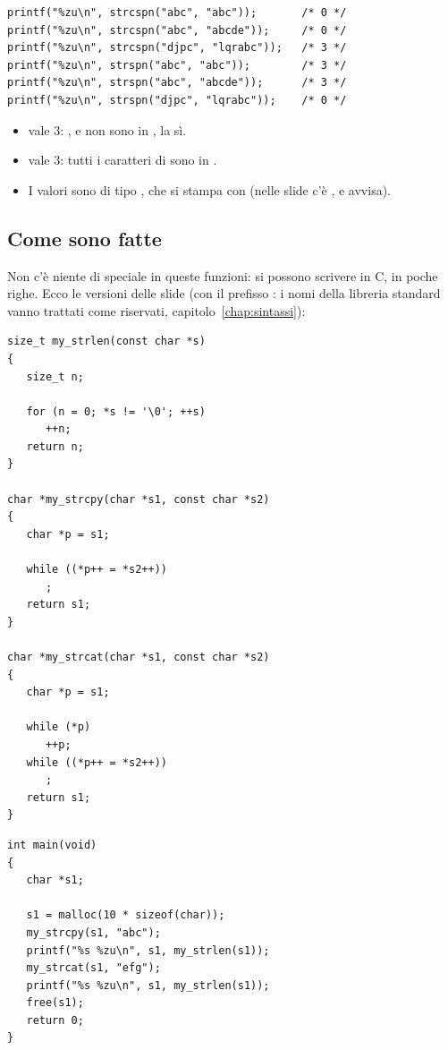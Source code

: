 \begin{affianco}[0.55][c]
\begin{lstlisting}[style=c, name=spn.c]
printf("%zu\n", strcspn("abc", "abc"));       /* 0 */
printf("%zu\n", strcspn("abc", "abcde"));     /* 0 */
printf("%zu\n", strcspn("djpc", "lqrabc"));   /* 3 */
printf("%zu\n", strspn("abc", "abc"));        /* 3 */
printf("%zu\n", strspn("abc", "abcde"));      /* 3 */
printf("%zu\n", strspn("djpc", "lqrabc"));    /* 0 */
\end{lstlisting}
\risultato
\begin{itemize}
  \item {} vale 3: ,  e
         non sono in , la  sì.
  \item {} vale 3: tutti i caratteri di
         sono in .
  \item I valori sono di tipo , che si stampa con 
        (nelle slide c'è , e  avvisa).
\end{itemize}
\end{affianco}

\subsection{Come sono fatte}

Non c'è niente di speciale in queste funzioni: si possono scrivere in C, in
poche righe. Ecco le versioni delle slide (con il prefisso : i
nomi della libreria standard vanno trattati come riservati,
capitolo~\ref{chap:sintassi}):

\begin{affianco}[0.5][c]
\begin{lstlisting}[style=c, name=mystr.c]
size_t my_strlen(const char *s)
{
   size_t n;

   for (n = 0; *s != '\0'; ++s)
      ++n;
   return n;
}

char *my_strcpy(char *s1, const char *s2)
{
   char *p = s1;

   while ((*p++ = *s2++))
      ;
   return s1;
}

char *my_strcat(char *s1, const char *s2)
{
   char *p = s1;

   while (*p)
      ++p;
   while ((*p++ = *s2++))
      ;
   return s1;
}
\end{lstlisting}
\risultato
\begin{lstlisting}[style=c]
int main(void)
{
   char *s1;

   s1 = malloc(10 * sizeof(char));
   my_strcpy(s1, "abc");
   printf("%s %zu\n", s1, my_strlen(s1));
   my_strcat(s1, "efg");
   printf("%s %zu\n", s1, my_strlen(s1));
   free(s1);
   return 0;
}
\end{lstlisting}
\end{affianco}

